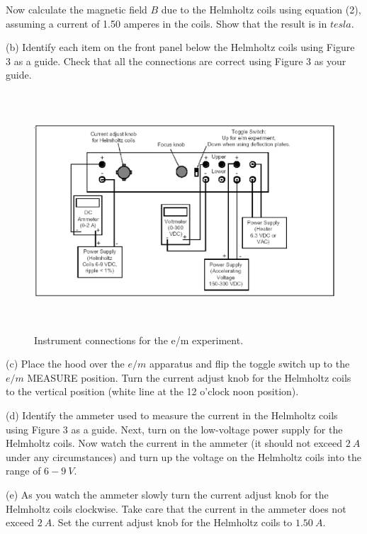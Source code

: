 Now calculate the magnetic field $B$ due to the Helmholtz coils using equation 
(2), assuming a current of 1.50 amperes in the coils. Show that the result is 
in $tesla$.
\vspace{30mm}

(b) Identify each item on the front panel below
the Helmholtz coils using Figure 3 as a guide.
Check that all the connections are correct using Figure 3 as your guide. 
\begin{figure}[hbt]
\begin{center}

\includegraphics[height=3.5in]{eoverm/apparatus2.eps}

\caption{Instrument connections for the e/m experiment.}

\end{center}
\end{figure}

(c) Place the hood over the $e/m$ apparatus and flip the 
toggle switch up to the $e/m$ MEASURE
position.
Turn the current adjust knob for the Helmholtz coils to the vertical position (white line
at the 12 o'clock noon position).

(d) Identify the ammeter used to measure the current in the Helmholtz
coils using Figure 3 as a guide. 
Next, turn on the low-voltage power supply for the Helmholtz coils.
Now watch the current in the ammeter (it should not exceed $2~A$ under
any circumstances) and
turn up the voltage on the Helmholtz coils into the range of $6-9~V$.

(e) As you watch the ammeter slowly turn the current adjust knob for the 
Helmholtz coils clockwise. Take care that
the current in the ammeter does not exceed $2 ~A$.
Set the current adjust knob for the Helmholtz coils to $1.50~A$.

